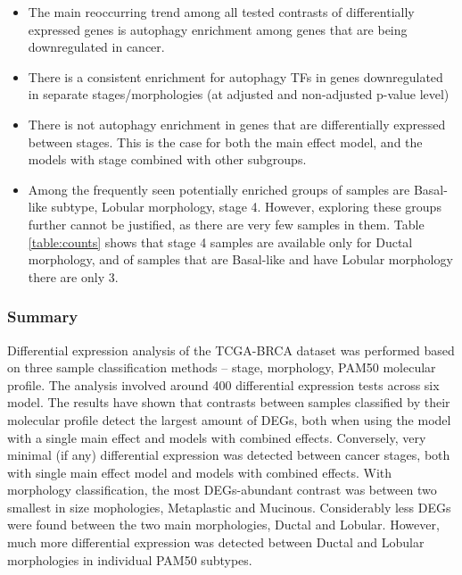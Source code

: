         \begin{itemize}
            
        \item The main reoccurring trend among all tested contrasts of differentially expressed genes is autophagy enrichment among genes that are being downregulated in cancer. 
        \item There is a consistent enrichment for autophagy TFs in genes downregulated in separate stages/morphologies (at adjusted and non-adjusted p-value level)
       \item There is not autophagy enrichment in genes that are differentially expressed between stages. This is the case for both the main effect model, and the models with stage combined with other subgroups.

       \item Among the frequently seen potentially enriched groups of samples are Basal-like subtype, Lobular morphology, stage 4.  However, exploring these groups further cannot be justified, as there are very few samples in them. Table \ref{table:counts} shows that stage 4 samples are available only for Ductal morphology, and of samples that are Basal-like and have Lobular morphology there are only 3. 

        
        \end{itemize}
        \subsubsection{Summary}
        
        Differential expression analysis of the TCGA-BRCA dataset was performed based on three sample classification methods -- stage, morphology, PAM50 molecular profile. The analysis involved around 400 differential expression tests across six model. The results have shown that contrasts between samples classified by their molecular profile detect the largest amount of DEGs, both when using the model with a single main effect and models with combined effects. Conversely, very minimal (if any) differential expression was detected between cancer stages, both with single main effect model and models with combined effects. With morphology classification, the most DEGs-abundant contrast was between two smallest in size mophologies, Metaplastic and Mucinous. Considerably less DEGs were found between the two main morphologies, Ductal and Lobular. However, much more differential expression was detected between Ductal and Lobular morphologies in individual PAM50 subtypes. 
        
